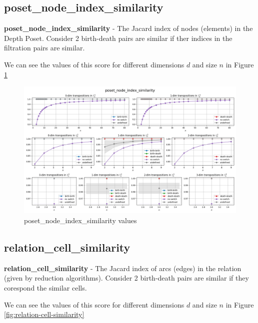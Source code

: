 \documentclass{article}
\begin{document}
\subsection{poset\_node\_index\_similarity}
\par \textbf{poset\_node\_index\_similarity} - The Jacard index of nodes (elements) in the Depth Poset.
    Consider 2 birth-death pairs are similar if ther indices in the filtration pairs are similar.
\par We can see the values of this score for different dimensions $d$ and size $n$ in Figure \ref{fig:poset-node-index-similarity}

\begin{figure}[h!]
    \centering
    \includegraphics[width=1.3\textwidth]{pics/torus-transpositions/similaritites/score=poset-node-index-similarity.png}
    \caption{poset\_node\_index\_similarity values}
    \label{fig:poset-node-index-similarity}
\end{figure}

\subsection{relation\_cell\_similarity}
\par \textbf{relation\_cell\_similarity} - The Jacard index of arcs (edges) in the relation (given by reduction algorithms).
    Consider 2 birth-death pairs are similar if they corespond the similar cells.
\par We can see the values of this score for different dimensions $d$ and size $n$ in Figure \ref{fig:relation-cell-similarity}
\end{document}
